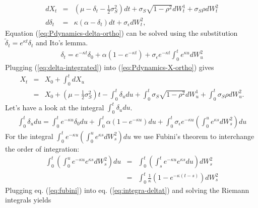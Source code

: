 \documentclass[a4paper,11pt]{article}
\newcommand{\sigmaS}{\sigma_S}
\newcommand{\sigmaE}{\sigma_\epsilon}
\begin{document}
\begin{appendix}
\begin{eqnarray}
  dX_t &=& \left(\mu - \delta_t - \frac{1}{2}\sigmaS^2\right)dt +
  \sigmaS \sqrt{1 - \rho^2 }dW_t^1 + \sigmaS \rho dW_t^2 \label{eq:Pdynamics-X-ortho}\\
  d\delta_t &=& \kappa (\alpha - \delta_t) dt + \sigmaE dW_t^2, \label{eq:Pdynamics-delta-ortho}
\end{eqnarray}
Equation (\ref{eq:Pdynamics-delta-ortho}) can be solved using the
substitution $\tilde{\delta}_t = e^{\kappa t}\delta_t$ and Ito's lemma.
\begin{equation}
\label{eq:delta-integrated}
\begin{split}
  \delta_t = e^{-\kappa t}\delta_0 + \alpha \left(1 -
    e^{-\kappa t}\right) +
  \sigmaE e^{-\kappa t} \int_0^te^{\kappa u}dW_u^2
\end{split}
\end{equation}
Plugging (\ref{eq:delta-integrated}) into (\ref{eq:Pdynamics-X-ortho})
gives
\begin{eqnarray}
  \label{eq:x}
  X_t &=& X_0 + \int_0^t dX_u\\
  &=& X_0 + \left(\mu - \frac{1}{2}\sigmaS^2\right) t -  \int_0^t
  \delta_u du  + \int_0^t  \sigmaS \sqrt{1 - \rho^2} dW_u^1 + \int_0^t  \sigmaS \rho dW_u^2.
\end{eqnarray}
Let's have a look at the integral $\int_0^t \delta_u du$.
\begin{equation}\label{eq:integra-deltat}
\begin{split}
  \int_0^t \delta_u du = \int_0^t e^{-\kappa u}\delta_0 du + \int_0^t \alpha \left(1 -
    e^{-\kappa u}\right) du + \int_0^t\sigmaE e^{-\kappa u} \left(\int_0^u
  e^{\kappa s}dW_s^2 \right) du
\end{split}
\end{equation}
For the integral $\int_0^te^{-\kappa u}\left(\int_0^u e^{\kappa
    s}dW_s^2\right) du$ we use Fubini's theorem to interchange the
order of integration:
\begin{eqnarray}
  \int_0^t\left(\int_0^u  e^{-\kappa u} e^{\kappa
      s}dW_s^2\right) du &=& \int_0^t\left(\int_s^t  e^{-\kappa u} e^{\kappa
      s}du\right) dW_s^2\\
  &=& \int_0^t \frac{1}{\kappa}\left(1 - e^{-\kappa (t - s)}\right)
  dW_s^2 \label{eq:fubini}
\end{eqnarray}
Plugging eq. (\ref{eq:fubini}) into eq. (\ref{eq:integra-deltat}) and
solving the Riemann integrals yields
\begin{equation}\label{eq:integra-deltat-fubini}
\begin{split}

\end{split}
\end{equation}
\end{appendix}
\end{document}

